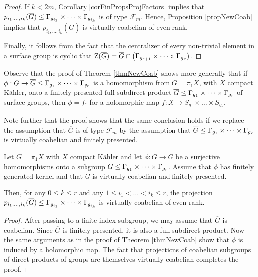 \begin{proof}
 
If $k<2 m$, Corollary \ref{corFinPropsProjFactors} implies that $p_{i_1,\dots,i_k}(\overline{G})\leq \Gamma_{g_{i_1}}\times \dots \times \Gamma_{g_{i_k}}$ is of type $\mathcal{F}_m$. Hence, Proposition \ref{propNewCoab} implies that $p_{i_1,\dots,i_k}(\overline{G})$ is virtually coabelian of even rank.

Finally, it follows from the fact that the centralizer of every non-trivial element in a surface group is cyclic that $\mathrm{Z}(\overline{G})=\overline{G}\cap\left( \Gamma_{g_{s+1}}\times \dots \times \Gamma_{g_r}\right)$.
\end{proof}

\begin{remark}
Observe that the proof of Theorem \ref{thmNewCoab} shows more generally that if $\phi :G \rightarrow \overline{G}\leq \Gamma_{g_1}\times \dots \times \Gamma_{g_r}$ is a homomorphism from $G=\pi_1 X$, with $X$ compact K\"ahler, onto a finitely presented full subdirect product $\overline{G}\leq \Gamma_{g_1}\times \dots \times \Gamma_{g_r}$ of surface groups, then $\phi = f_{\ast}$ for a holomorphic map $f: X \to S_{g_1}\times \dots \times S_{g_r}$.
\label{rmkNewCoab1}
\end{remark}


Note further that the proof shows that the same conclusion holds if we replace the assumption that $\overline{G}$ is of type $\mathcal{F}_m$ by the assumption that $\overline{G}\leq \Gamma_{g_1}\times \dots \times \Gamma_{g_r}$ is virtually coabelian and finitely presented.
\begin{corollary}
\label{rmkNewCoab}
 Let $G=\pi_1 X$ with $X$ compact K\"ahler and let $\phi: G \rightarrow \overline{G}$ be a surjective homomorphisms onto a subgroup $\overline{G}\leq \Gamma_{g_1}\times \dots \times \Gamma_{g_r}$. Assume that $\phi$ has finitely generated kernel and that $\overline{G}$ is virtually coabelian and finitely presented.
 
 Then, for any $0\leq k \leq r$ and any $1\leq i_1 < \dots < i_k\leq r$, the projection $p_{i_1,\dots,i_k}(\overline{G})\leq \Gamma_{g_{i_1}}\times \dots \times \Gamma_{g_{i_k}}$ is virtually coabelian of even rank. 

\end{corollary}
\begin{proof}
 After passing to a finite index subgroup, we may assume that $\overline{G}$ is coabelian. Since $\overline{G}$ is finitely presented, it is also a full subdirect product. Now the same arguments as in the proof of Theorem \ref{thmNewCoab} show that $\phi$ is induced by a holomorphic map. The fact that projections of coabelian subgroups of direct products of groups are themselves virtually coabelian completes the proof.
\end{proof}

